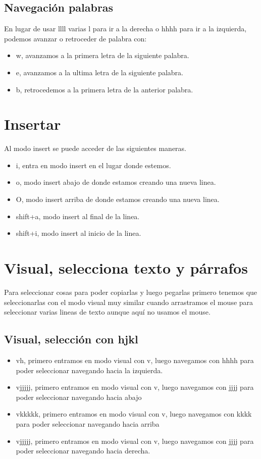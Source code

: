 \subsection{Navegación palabras}
En lugar de usar llll varias l para ir a la derecha o hhhh para ir a la izquierda, podemos avanzar o retroceder de palabra con:
\begin{itemize}
  \item w, avanzamos a la primera letra de la siguiente palabra.
  \item e, avanzamos a la ultima letra de la siguiente palabra.
  \item b, retrocedemos a la primera letra de la anterior palabra.
\end{itemize}
\section{Insertar}
Al modo insert se puede acceder de las siguientes maneras.
\begin{itemize}
  \item i, entra en modo insert en el lugar donde estemos.
  \item o, modo insert abajo de donde estamos creando una nueva linea.
  \item O, modo insert arriba de donde estamos creando una nueva linea.
  \item shift+a, modo insert al final de la linea.
  \item shift+i, modo insert al inicio de la linea.
\end{itemize}
\section{Visual, selecciona texto y párrafos}
Para seleccionar cosas para poder copiarlas y luego pegarlas primero tenemos que seleccionarlas con el modo visual muy similar cuando arrastramos el mouse para seleccionar varias lineas de texto aunque aquí no usamos el mouse.
\subsection{Visual, selección con hjkl}
\begin{itemize}
  \item vh, primero entramos en modo visual con v, luego navegamos con hhhh para poder seleccionar navegando hacia la izquierda.
  \item vjjjjj, primero entramos en modo visual con v, luego navegamos con jjjj para poder seleccionar navegando hacia abajo
  \item vkkkkk, primero entramos en modo visual con v, luego navegamos con kkkk para poder seleccionar navegando hacia arriba 
  \item vjjjjj, primero entramos en modo visual con v, luego navegamos con jjjj para poder seleccionar navegando hacia derecha.
\end{itemize}
